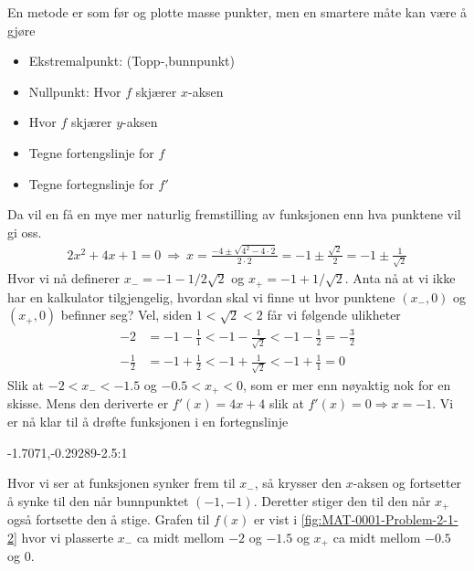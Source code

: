 \documentclass[a4paper,11pt]{article}
\begin{document}
\begin{solution}
    En metode er som før og plotte masse punkter, men en smartere måte 
    kan være å gjøre
    \begin{itemize}
        \item Ekstremalpunkt: (Topp-,bunnpunkt)
        \item Nullpunkt: Hvor $f$ skjærer $x$-aksen
        \item Hvor $f$ skjærer $y$-aksen
        \item Tegne fortengslinje for $f$
        \item Tegne fortegnslinje for $f'$
    \end{itemize}
    Da vil en få en mye mer naturlig fremstilling av funksjonen enn hva
    punktene vil gi oss. 
    \begin{align*}
        2x^2 + 4x + 1 = 0
         \ \Rightarrow \ x = \frac{-4 \pm \sqrt{4^2 - 4\cdot 2}}{2 \cdot 2} = -1 \pm \frac{\sqrt{2}}{2} = -1 \pm \frac{1}{\sqrt{2}} 
    \end{align*}
    Hvor vi nå definerer $x_{-} = -1 - 1/2\sqrt{2}$ og $x_{+} = -1 + 1/\sqrt{2}$.
    Anta nå at vi ikke har en kalkulator tilgjengelig, hvordan skal vi finne ut 
    hvor punktene $(x_{-},0)$ og $(x_{+}, 0)$ befinner seg? Vel, siden 
    $1 < \sqrt{2} < 2$ får vi følgende ulikheter
    \begin{align*}
          -2 &= -1 - \frac{1}{1} < -1 - \frac{1}{\sqrt{2}} < -1 - \frac{1}{2} = - \frac{3}{2} \\
-\frac{1}{2} &= -1 + \frac{1}{2} < -1 + \frac{1}{\sqrt{2}} < -1 + \frac{1}{1} = 0
    \end{align*}
    Slik at $-2 < x_{-} < -\num{1.5}$ og $\num{-0.5}<x_{+}<0$, som er mer enn nøyaktig nok for en skisse.
    Mens den deriverte er $f'(x) = 4x + 4$ slik at $f'(x) = 0 \Rightarrow x = -1$.
    Vi er nå klar til å drøfte funksjonen i en fortegnslinje
    
    \begin{center}
        \begin{functionallines}[
            extra x tick labels={$x_{-}$,$x_{+}$},
            xtick={-2, -1, 0, 1, 2}]{-1.7071,-0.29289}{-2.5:1}
        \end{functionallines}
    \end{center}
    
    Hvor vi ser at funksjonen synker frem til $x_{-}$, så krysser den $x$-aksen
    og fortsetter å synke til den når bunnpunktet $(-1,-1)$. Deretter stiger den
    til den når $x_{+}$ også fortsette den å stige. Grafen til $f(x)$ er vist i
    \cref{fig:MAT-0001-Problem-2-1-2} hvor vi plasserte $x_{-}$ ca midt mellom
    $-2$ og $-1.5$ og $x_{+}$ ca midt mellom $-\num{0.5}$ og $0$.
\end{solution}
\end{document}
